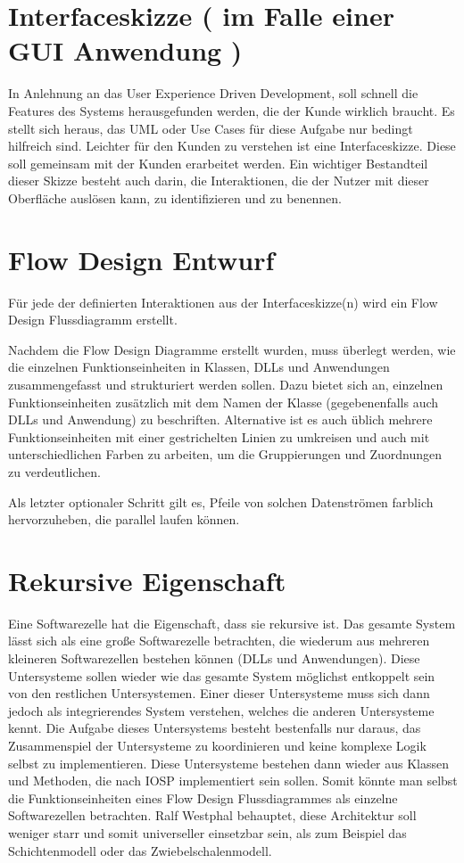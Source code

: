 \section{Interfaceskizze ( im Falle einer GUI Anwendung )}

In Anlehnung an das User Experience Driven Development, soll schnell die
Features des Systems herausgefunden werden, die der Kunde wirklich
braucht. Es stellt sich heraus, das UML oder Use Cases für diese Aufgabe nur
bedingt hilfreich sind. Leichter für den Kunden zu verstehen ist eine
Interfaceskizze.
Diese soll gemeinsam mit der Kunden erarbeitet werden. Ein wichtiger Bestandteil
dieser Skizze besteht auch darin, die Interaktionen, die der
Nutzer mit dieser Oberfläche auslösen kann, zu identifizieren und zu benennen.

\section{Flow Design Entwurf}

Für jede der definierten Interaktionen aus der Interfaceskizze(n) wird ein Flow Design Flussdiagramm
erstellt.

Nachdem die Flow Design Diagramme erstellt wurden, muss überlegt werden, wie die
einzelnen Funktionseinheiten in Klassen, DLLs und Anwendungen zusammengefasst
und strukturiert werden sollen.
Dazu bietet sich an, einzelnen Funktionseinheiten zusätzlich mit dem Namen der
Klasse (gegebenenfalls auch DLLs und Anwendung) zu beschriften. Alternative ist es
auch üblich mehrere Funktionseinheiten mit einer gestrichelten Linien zu
umkreisen und auch mit unterschiedlichen Farben zu arbeiten, um die Gruppierungen und Zuordnungen zu verdeutlichen. 

Als letzter optionaler Schritt gilt es, Pfeile von solchen Datenströmen farblich hervorzuheben, die
parallel laufen können.

\section{Rekursive Eigenschaft}

Eine Softwarezelle hat die Eigenschaft, dass sie rekursive ist.
Das gesamte System lässt sich als eine große Softwarezelle betrachten, die wiederum
aus mehreren kleineren Softwarezellen bestehen können (DLLs und Anwendungen).
Diese Untersysteme sollen wieder wie das gesamte System möglichst entkoppelt
sein von den restlichen Untersystemen. Einer dieser Untersysteme muss sich dann
jedoch als integrierendes System verstehen, welches die anderen Untersysteme
kennt. Die Aufgabe dieses Untersystems besteht bestenfalls nur daraus, das
Zusammenspiel der Untersysteme zu koordinieren und keine komplexe Logik selbst zu implementieren.
Diese Untersysteme bestehen dann wieder aus Klassen und Methoden, die nach IOSP
implementiert sein sollen.
Somit könnte man selbst die Funktionseinheiten eines Flow Design
Flussdiagrammes als einzelne Softwarezellen betrachten.
Ralf Westphal behauptet, diese Architektur soll weniger starr und somit
universeller einsetzbar sein, als zum Beispiel das Schichtenmodell oder das Zwiebelschalenmodell.